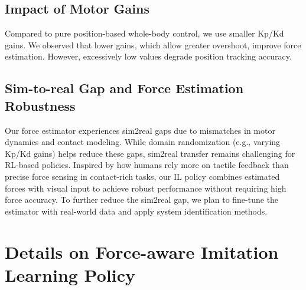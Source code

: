 \documentclass{article}
\begin{document}
\subsection{Impact of Motor Gains}

Compared to pure position-based whole-body control, we use smaller Kp/Kd gains. We observed that lower gains, which allow greater overshoot, improve force estimation. However, excessively low values degrade position tracking accuracy.

\subsection{Sim-to-real Gap and Force Estimation Robustness}

Our force estimator experiences sim2real gaps due to mismatches in motor dynamics and contact modeling. While domain randomization (e.g., varying Kp/Kd gains) helps reduce these gaps, sim2real transfer remains challenging for RL-based policies. Inspired by how humans rely more on tactile feedback than precise force sensing in contact-rich tasks, our IL policy combines estimated forces with visual input to achieve robust performance without requiring high force accuracy. To further reduce the sim2real gap, we plan to fine-tune the estimator with real-world data and apply system identification methods. 


\section{Details on Force-aware Imitation Learning Policy} \label{sec:appendix:il_training_details}

\begin{table}[h]
    \caption{Imitation learning results (\textbf{50 trials per task})}
    \label{tab:rebuttal_il_performance}
    \centering
\end{table}
\end{document}
